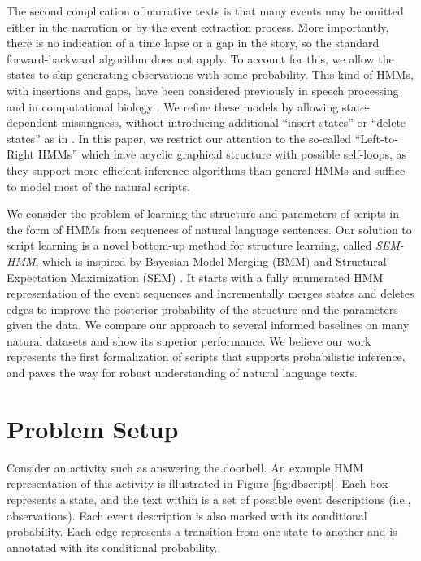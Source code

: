 \documentclass[letterpaper]{article}
\begin{document}
The second complication of narrative texts is that many events may be omitted either in the narration or by the event extraction process. %
More importantly, there is no indication of a time lapse or a gap in the story, so the standard forward-backward algorithm does not apply.  To account for this, we allow the states to skip generating observations with some probability. This kind of HMMs, with insertions and gaps, have been considered previously in speech processing \cite{bahl} and in computational biology \cite{profileHMMs}. We refine these models by allowing state-dependent missingness, without introducing additional ``insert states'' or ``delete states'' as in \cite{profileHMMs}.
In this paper, we restrict our attention to the so-called ``Left-to-Right HMMs'' which
have acyclic graphical structure with possible self-loops, as they support more efficient inference algorithms than general HMMs and suffice to model most of the natural scripts. %

We consider the problem of learning the structure and parameters of scripts in the form of HMMs from sequences of natural language sentences. Our solution to script learning is a novel bottom-up method for structure learning, called {\em SEM-HMM}, which is inspired by Bayesian Model Merging (BMM) \cite{stolcke1994best} and Structural Expectation Maximization (SEM)  \cite{friedman1998bayesian}. It starts with a fully enumerated HMM representation of the event sequences and incrementally merges states and deletes edges to improve the posterior probability of the structure and the parameters given the data. We compare our approach to several informed baselines on many natural datasets and show its superior performance. We believe our work represents the first formalization of scripts that supports probabilistic inference, and paves the way for robust understanding of natural language texts.

\section{Problem Setup}

Consider an activity such as answering the doorbell.  An example HMM representation of this activity is illustrated in Figure \ref{fig:dbscript}.  Each box represents a state, and the text within is a set of possible event descriptions (i.e., observations). Each event description is also marked with its conditional probability.  %
Each edge represents a transition from one state to another and is annotated with its conditional probability.
\end{document}
